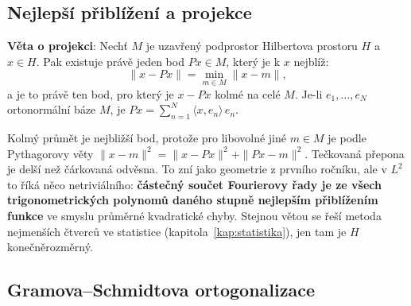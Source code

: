 \subsection{Nejlepší přiblížení a projekce}

\begin{definitionbox}
  \textbf{Věta o projekci}: Nechť $M$ je uzavřený podprostor Hilbertova prostoru $H$ a $x\in H$. Pak existuje právě jeden bod $Px\in M$, který je k $x$ nejblíž:
  \begin{equation*}
    \|x - Px\| = \min_{m\in M}\|x - m\|,
  \end{equation*}
  a je to právě ten bod, pro který je $x - Px$ kolmé na celé $M$. Je-li $e_1, \dots, e_N$ ortonormální báze $M$, je $Px = \sum_{n=1}^{N}\langle x, e_n\rangle\,e_n$.
\end{definitionbox}

\begin{center}
\end{center}

Kolmý průmět je nejbližší bod, protože pro libovolné jiné $m\in M$ je podle Pythagorovy věty $\|x - m\|^2 = \|x - Px\|^2 + \|Px - m\|^2$. Tečkovaná přepona je delší než čárkovaná odvěsna. To zní jako geometrie z prvního ročníku, ale v $L^2$ to říká něco netriviálního: \textbf{částečný součet Fourierovy řady je ze všech trigonometrických polynomů daného stupně nejlepším přiblížením funkce} ve smyslu průměrné kvadratické chyby. Stejnou větou se řeší metoda nejmenších čtverců ve statistice (kapitola~\ref{kap:statistika}), jen tam je $H$ konečněrozměrný.

\subsection{Gramova--Schmidtova ortogonalizace}

